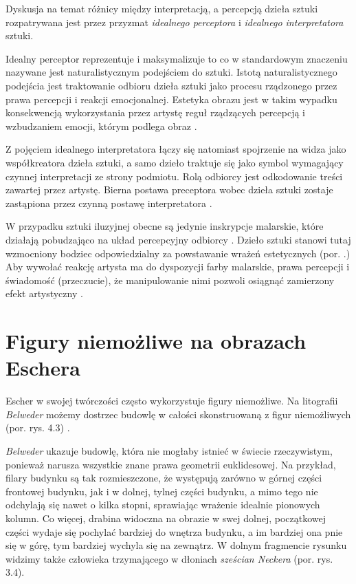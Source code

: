 \documentclass[licencjacka]{kdypl}
\begin{document}
Dyskusja na temat różnicy między interpretacją, a percepcją dzieła sztuki rozpatrywana jest przez przyzmat \textit{idealnego perceptora} i \textit{idealnego interpretatora} sztuki.

Idealny perceptor reprezentuje i maksymalizuje to co w standardowym znaczeniu nazywane jest naturalistycznym podejściem do sztuki. Istotą naturalistycznego podejścia jest traktowanie odbioru dzieła sztuki jako procesu rządzonego przez prawa percepcji i reakcji emocjonalnej. Estetyka obrazu jest w takim wypadku konsekwencją wykorzystania przez artystę reguł rządzących percepcją i wzbudzaniem emocji, którym podlega obraz \citep[s. 396]{Florek2006}.

Z pojęciem idealnego interpretatora łączy się natomiast spojrzenie na widza jako współkreatora dzieła sztuki, a samo dzieło traktuje się jako symbol wymagający czynnej interpretacji ze strony podmiotu. Rolą odbiorcy jest odkodowanie treści zawartej przez artystę. Bierna postawa preceptora wobec dzieła sztuki zostaje zastąpiona przez czynną postawę interpretatora  \citep[s. 396]{Florek2006}.

W przypadku sztuki iluzyjnej obecne są jedynie inskrypcje malarskie, które działają pobudzająco na układ percepcyjny odbiorcy \citep[s. 397]{Florek2006}. Dzieło sztuki stanowi tutaj wzmocniony bodziec odpowiedzialny za powstawanie wrażeń estetycznych (por. \citealt[s. 353]{Rama}.) Aby wywołać reakcję artysta ma do dyspozycji farby malarskie, prawa percepcji i świadomość (przeczucie), że manipulowanie nimi pozwoli osiągnąć zamierzony efekt artystyczny \citep[s. 396 - 397]{Florek2006}.








\section{Figury niemożliwe na obrazach Eschera}

Escher w swojej twórczości często wykorzystuje figury niemożliwe. Na litografii \textit{Belweder} możemy dostrzec budowlę w całości skonstruowaną z figur niemożliwych (por. rys. 4.3) \citep[s. 142]{Locher}.



\textit{Belweder} ukazuje budowlę, która nie mogłaby istnieć w świecie rzeczywistym, ponieważ narusza wszystkie znane prawa geometrii euklidesowej. Na przykład, filary budynku są tak rozmieszczone, że występują zarówno w górnej części frontowej budynku, jak i w dolnej, tylnej części budynku, a mimo tego nie odchylają się nawet o kilka stopni, sprawiając wrażenie idealnie pionowych kolumn. Co więcej, drabina widoczna na obrazie w swej dolnej, początkowej części  wydaje się pochylać bardziej do wnętrza budynku, a im bardziej ona pnie się w górę, tym bardziej wychyla się na zewnątrz. W dolnym fragmencie rysunku widzimy także człowieka trzymającego w dłoniach \textit{sześcian Neckera} (por. rys. 3.4).
\end{document}

